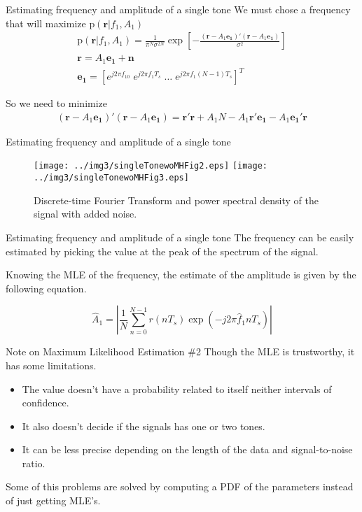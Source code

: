 ﻿\documentclass[mathserif]{beamer}
\begin{document}
	\begin{frame}{Estimating frequency and amplitude of a single tone}
		We must chose a frequency that will maximize $\mathrm{p}(\mathbf{r}|f_1,A_1)$
		\begin{gather*}
			\mathrm{p}(\mathbf{r}|f_1,A_1) = \frac{1}{\pi^N\sigma^{2N}}\exp\left[-\frac{(\mathbf{r}-A_1\mathbf{e_1})'
				(\mathbf{r}-A_1\mathbf{e_1})}{\sigma^2}\right] \\	
			\mathbf{r} = A_1\mathbf{e_1} + \mathbf{n} \\
			\mathbf{e_1} =  [e^{j2\pi f_10} \; e^{j2\pi f_1T_s} \; \dots \; e^{j2\pi f_1(N-1)T_s}]^T 			
		\end{gather*}
		
		So we need to minimize
		\begin{gather*}
		(\mathbf{r}-A_1\mathbf{e_1})'(\mathbf{r}-A_1\mathbf{e_1}) = \mathbf{r'r}+A_1N-A_1\mathbf{r'e_1}-A_1\mathbf{e_1'r}
		\end{gather*}
	\end{frame}
	
	\begin{frame}{Estimating frequency and amplitude of a single tone}
		\begin{figure}
			\centering
			\texttt{[image: ../img3/singleTonewoMHFig2.eps]}
			\texttt{[image: ../img3/singleTonewoMHFig3.eps]}
			\caption{Discrete-time Fourier Transform and power spectral density of the signal with added noise.}
		\end{figure}
	\end{frame}
	
	\begin{frame}{Estimating frequency and amplitude of a single tone}
		The frequency can be easily estimated by picking the value at the peak of the spectrum of the signal.
		
		Knowing the MLE of the frequency, the estimate of the amplitude is given by the following equation.
		
		\begin{equation*}
			\hat{A}_1 = \left|\frac{1}{N} \sum_{n=0}^{N-1} r(nT_s)\exp{(-j2\pi \hat{f}_1nT_s)} \right|
		\end{equation*}
	\end{frame}
	
	\begin{frame}{Note on Maximum Likelihood Estimation \#2}
		Though the MLE is trustworthy, it has some limitations.
		\begin{itemize}
			\item The value doesn't have a probability related to itself neither intervals of confidence.
			\item It also doesn't decide if the signals has one or two tones.
			\item It can be less precise depending on the length of the data and signal-to-noise ratio.
		\end{itemize}
		Some of this problems are solved by computing a PDF of the parameters instead of just getting MLE's.
	\end{frame}
	
\end{document}
